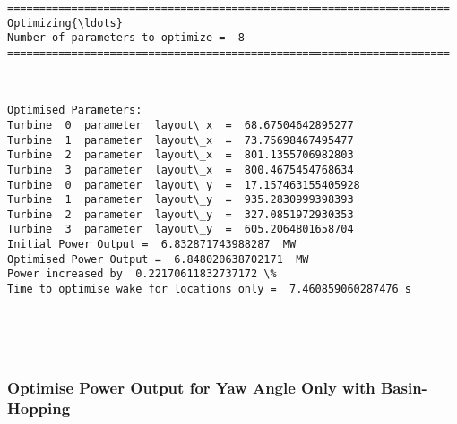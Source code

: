 \documentclass[11pt]{article}
\begin{document}
    \begin{Verbatim}[commandchars=\\\{\}]
=====================================================================
Optimizing{\ldots}
Number of parameters to optimize =  8
=====================================================================

    \end{Verbatim}

    \begin{center}
    \end{center}
    { \hspace*{\fill} \\}
    
    \begin{Verbatim}[commandchars=\\\{\}]
Optimised Parameters:
Turbine  0  parameter  layout\_x  =  68.67504642895277
Turbine  1  parameter  layout\_x  =  73.75698467495477
Turbine  2  parameter  layout\_x  =  801.1355706982803
Turbine  3  parameter  layout\_x  =  800.4675454768634
Turbine  0  parameter  layout\_y  =  17.157463155405928
Turbine  1  parameter  layout\_y  =  935.2830999398393
Turbine  2  parameter  layout\_y  =  327.0851972930353
Turbine  3  parameter  layout\_y  =  605.2064801658704
Initial Power Output =  6.832871743988287  MW
Optimised Power Output =  6.848020638702171  MW
Power increased by  0.22170611832737172 \%
Time to optimise wake for locations only =  7.460859060287476 s

    \end{Verbatim}

    \begin{center}
    \end{center}
    { \hspace*{\fill} \\}
    
    \begin{center}
    \end{center}
    { \hspace*{\fill} \\}
    
    \hypertarget{optimise-power-output-for-yaw-angle-only-with-basin-hopping}{%
\subsubsection{Optimise Power Output for Yaw Angle Only with
Basin-Hopping}\label{optimise-power-output-for-yaw-angle-only-with-basin-hopping}}
\end{document}
